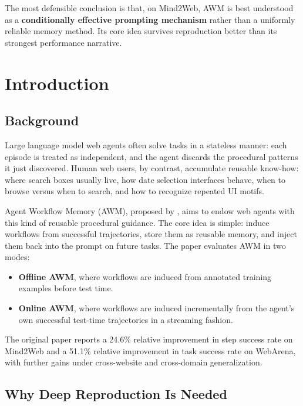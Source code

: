 \documentclass{article}
\providecommand{\tightlist}{%
  \setlength{\itemsep}{0pt}\setlength{\parskip}{0.8em}}
\begin{document}
The most defensible conclusion is that, on Mind2Web, AWM is best
understood as a \textbf{conditionally effective prompting mechanism}
rather than a uniformly reliable memory method. Its core idea survives
reproduction better than its strongest performance narrative.

\section{Introduction}\label{introduction}

\subsection{Background}\label{background}

Large language model web agents often solve tasks in a stateless manner:
each episode is treated as independent, and the agent discards the
procedural patterns it just discovered. Human web users, by contrast,
accumulate reusable know-how: where search boxes usually live, how date
selection interfaces behave, when to browse versus when to search, and
how to recognize repeated UI motifs.

Agent Workflow Memory (AWM), proposed by \textcite{wang2024agent}, aims to
endow web agents with this kind of reusable procedural guidance. The
core idea is simple: induce workflows from successful trajectories,
store them as reusable memory, and inject them back into the prompt on
future tasks. The paper evaluates AWM in two modes:

\begin{itemize}
\tightlist
\item
  \textbf{Offline AWM}, where workflows are induced from annotated
  training examples before test time.
\item
  \textbf{Online AWM}, where workflows are induced incrementally from
  the agent's own successful test-time trajectories in a streaming
  fashion.
\end{itemize}

The original paper reports a 24.6\% relative improvement in step success
rate on Mind2Web and a 51.1\% relative improvement in task success rate
on WebArena, with further gains under cross-website and cross-domain
generalization.

\subsection{Why Deep Reproduction Is
Needed}\label{why-deep-reproduction-is-needed}
\end{document}
